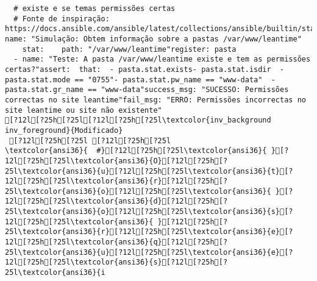 \documentclass{scrartcl}
\begin{document}
\begin{Verbatim}
  # existe e se temas permissões certas
  # Fonte de inspiração: https://docs.ansible.com/ansible/latest/collections/ansible/builtin/stat_module.html}- name: "Simulação: Obtem informação sobre a pastas /var/www/leantime"
    stat:    path: "/var/www/leantime"register: pasta
  - name: "Teste: A pasta /var/www/leantime existe e tem as permissões certas?"assert:  that:  - pasta.stat.exists- pasta.stat.isdir  - pasta.stat.mode == "0755"- pasta.stat.pw_name == "www-data"  - pasta.stat.gr_name == "www-data"success_msg: "SUCESSO: Permissões correctas no site leantime"fail_msg: "ERRO: Permissões incorrectas no site leantime ou site não existente"
[?12l[?25h[?25l[?12l[?25h[?25l\textcolor{inv_background inv_foreground}{Modificado}
 [?12l[?25h[?25l [?12l[?25h[?25l
\textcolor{ansi36}{  #}[?12l[?25h[?25l\textcolor{ansi36}{ }[?12l[?25h[?25l\textcolor{ansi36}{O}[?12l[?25h[?25l\textcolor{ansi36}{u}[?12l[?25h[?25l\textcolor{ansi36}{t}[?12l[?25h[?25l\textcolor{ansi36}{r}[?12l[?25h[?25l\textcolor{ansi36}{o}[?12l[?25h[?25l\textcolor{ansi36}{ }[?12l[?25h[?25l\textcolor{ansi36}{d}[?12l[?25h[?25l\textcolor{ansi36}{o}[?12l[?25h[?25l\textcolor{ansi36}{s}[?12l[?25h[?25l\textcolor{ansi36}{ }[?12l[?25h[?25l\textcolor{ansi36}{r}[?12l[?25h[?25l\textcolor{ansi36}{e}[?12l[?25h[?25l\textcolor{ansi36}{q}[?12l[?25h[?25l\textcolor{ansi36}{u}[?12l[?25h[?25l\textcolor{ansi36}{e}[?12l[?25h[?25l\textcolor{ansi36}{s}[?12l[?25h[?25l\textcolor{ansi36}{i

\end{Verbatim}
\end{document}
